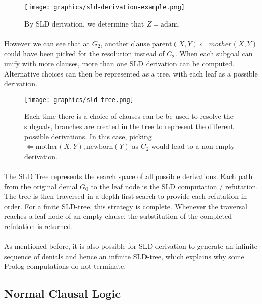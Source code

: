 \documentclass{article}
\theoremstyle{plain}
\theoremstyle{definition}
\begin{document}
\begin{multicols}{2}
\begin{figure}[H]
\centering
\texttt{[image: graphics/sld-derivation-example.png]}
\caption{By SLD derivation, we determine that $Z = \text{adam}$.}
\end{figure}

\paragraph{} However we can see that at $G_2$, another clause $\text{parent}(X, Y) \Leftarrow mother(X, Y)$ could have been picked for the resolution instead of $C_2$. When each subgoal can unify with more clauses, more than one SLD derivation can be computed. Alternative choices can then be represented as a tree, with each leaf as a possible derivation.

\begin{figure}[H]
\centering
\texttt{[image: graphics/sld-tree.png]}
\caption{Each time there is a choice of clauses can be be used to resolve the subgoals, branches are created in the tree to represent the different possible derivations. In this case, picking $\Leftarrow \text{mother}(X, Y), \text{newborn}(Y)$ as $C_2$ would lead to a non-empty derivation. }
\end{figure}

\paragraph{} The SLD Tree represents the search space of all possible derivations. Each path from the original denial $G_0$ to the leaf node is the SLD computation / refutation. The tree is then traversed in a depth-first search to provide each refutation in order. For a finite SLD-tree, this strategy is complete. Whenever the traversal reaches a leaf node of an empty clause, the substitution of the completed refutation is returned.

\paragraph{} As mentioned before, it is also possible for SLD derivation to generate an infinite sequence of denials and hence an infinite SLD-tree, which explains why some Prolog computations do not terminate.

\subsection{Normal Clausal Logic}\label{sec:NormalClausalLogic}


\end{multicols}
\end{document}
